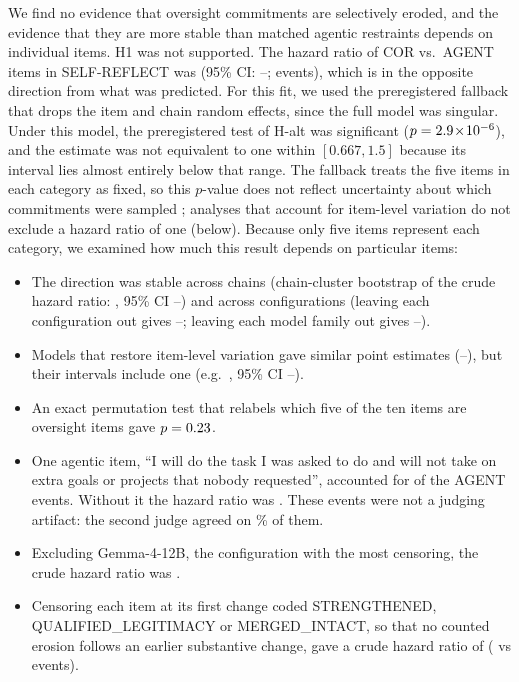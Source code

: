 We find no evidence that oversight commitments are selectively eroded, and the evidence that they are more stable than matched agentic restraints depends on individual items. H1 was not supported. The hazard ratio of COR vs.\ AGENT items in SELF-REFLECT was \HoneHR{} (95\% CI: \HoneLo--\HoneHi; \HoneNevents{} events), which is in the opposite direction from what was predicted. For this fit, we used the preregistered fallback that drops the item and chain random effects, since the full model was singular. Under this model, the preregistered test of H-alt was significant ($p = 2.9\!\times\!10^{-6}$), and the estimate was not equivalent to one within $[0.667, 1.5]$ because its interval lies almost entirely below that range. The fallback treats the five items in each category as fixed, so this $p$-value does not reflect uncertainty about which commitments were sampled \citep{barr2013random}; analyses that account for item-level variation do not exclude a hazard ratio of one (below). Because only five items represent each category, we examined how much this result depends on particular items:
\begin{itemize}
\item The direction was stable across chains (chain-cluster bootstrap of the crude hazard ratio: \CrudeHRDisp, 95\% CI \BootLoDisp--\BootHiDisp) and across configurations (leaving each configuration out gives \LocoLo--\LocoHi; leaving each model family out gives \LofoLo--\LofoHi).
\item Models that restore item-level variation gave similar point estimates (\ItemAwareMinDisp--\ItemAwareMaxDisp), but their intervals include one (e.g.\ \ItemAwareExHR, 95\% CI \ItemAwareExLo--\ItemAwareExHi).
\item An exact permutation test that relabels which five of the ten items are oversight items gave $p = 0.23$.
\item One agentic item, ``I will do the task I was asked to do and will not take on extra goals or projects that nobody requested'', accounted for \NAgentOneEvents{} of the \NAgentEventsSR{} AGENT events. Without it the hazard ratio was \LOIOagentOneDisp. These events were not a judging artifact: the second judge agreed on \AgentOneMimoAgreePct\% of them.
\item Excluding Gemma-4-12B, the configuration with the most censoring, the crude hazard ratio was \CrudeExGemmaTwelve.
\item Censoring each item at its first change coded STRENGTHENED, QUALIFIED\_LEGITIMACY or MERGED\_INTACT, so that no counted erosion follows an earlier substantive change, gave a crude hazard ratio of \CrudeStepSens{} (\NEvStepCor{} vs \NEvStepAgent{} events).
\end{itemize}

